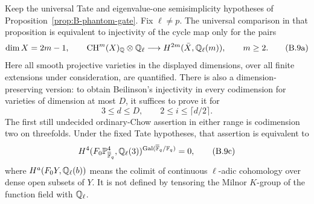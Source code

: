 \begin{proposition}
\label{prop:B-diagonal-Chow-gate}
Keep the universal Tate and eigenvalue-one semisimplicity hypotheses
of Proposition~\ref{prop:B-phantom-gate}.  Fix \(\ell\ne p\).
The universal comparison in that proposition is equivalent to
injectivity of the cycle map only for the pairs
\[
 \dim X=2m-1,\qquad
 \operatorname{CH}^{m}(X)_\mathbb Q\otimes\mathbb Q_\ell
       \longrightarrow H^{2m}(\bar X,\mathbb Q_\ell(m)),
 \qquad m\ge2.                                      \tag{B.9a}
\]
Here all smooth projective varieties in the displayed dimensions,
over all finite extensions under consideration, are quantified.
There is also a dimension-preserving version: to obtain
Beilinson's injectivity in every codimension for varieties of
dimension at most \(D\), it suffices to prove it for
\[
 3\le d\le D,\qquad 2\le i\le\lceil d/2\rceil.
 \tag{B.9b}
\]
The first still undecided ordinary-Chow assertion in either range
is codimension two on threefolds.  Under the fixed Tate hypotheses,
that assertion is equivalent to
\[
 H^4(F_0\mathbb P^4_{\overline{\mathbb F}_q},\mathbb Q_\ell(3))^
       {\operatorname{Gal}(\overline{\mathbb F}_q/\mathbb F_q)}=0,              \tag{B.9c}
\]
where \(H^a(F_0Y,\mathbb Q_\ell(b))\) means the colimit of
continuous \(\ell\)-adic cohomology over dense open subsets
of \(Y\).  It is not defined by tensoring the Milnor
\(K\)-group of the function field with \(\mathbb Q_\ell\).
\end{proposition}
